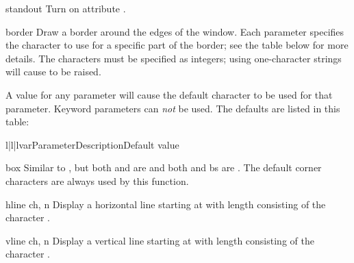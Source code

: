 \begin{methoddesc}{standout}{}
Turn on attribute .
\end{methoddesc}

\begin{methoddesc}{border}{}
Draw a border around the edges of the window. Each parameter specifies 
the character to use for a specific part of the border; see the table
below for more details.  The characters must be specified as integers;
using one-character strings will cause  to be
raised.

 A  value for any parameter will cause the
default character to be used for that parameter.  Keyword parameters
can \emph{not} be used.  The defaults are listed in this table:

\begin{tableiii}{l|l|l}{var}{Parameter}{Description}{Default value}
\end{tableiii}
\end{methoddesc}

\begin{methoddesc}{box}{}
Similar to , but both  and  are
 and both  and {bs} are .  The default
corner characters are always used by this function.
\end{methoddesc}

\begin{methoddesc}{hline}{ ch, n}
Display a horizontal line starting at  with
length  consisting of the character .
\end{methoddesc}

\begin{methoddesc}{vline}{ ch, n}
Display a vertical line starting at  with
length  consisting of the character .
\end{methoddesc}

